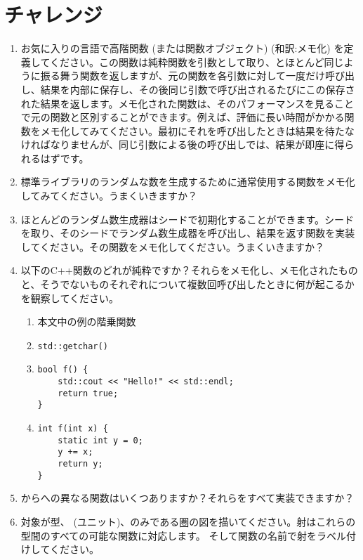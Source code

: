 \section{チャレンジ}

\begin{enumerate}
  \tightlist
  \item
        お気に入りの言語で高階関数 (または関数オブジェクト)  (和訳:メモ化) を定義してください。この関数は純粋関数を引数として取り、とほとんど同じように振る舞う関数を返しますが、元の関数を各引数に対して一度だけ呼び出し、結果を内部に保存し、その後同じ引数で呼び出されるたびにこの保存された結果を返します。メモ化された関数は、そのパフォーマンスを見ることで元の関数と区別することができます。例えば、評価に長い時間がかかる関数をメモ化してみてください。最初にそれを呼び出したときは結果を待たなければなりませんが、同じ引数による後の呼び出しでは、結果が即座に得られるはずです。
  \item
        標準ライブラリのランダムな数を生成するために通常使用する関数をメモ化してみてください。うまくいきますか？
  \item
        ほとんどのランダム数生成器はシードで初期化することができます。シードを取り、そのシードでランダム数生成器を呼び出し、結果を返す関数を実装してください。その関数をメモ化してください。うまくいきますか？
  \item
        以下のC++関数のどれが純粋ですか？それらをメモ化し、メモ化されたものと、そうでないものそれぞれについて複数回呼び出したときに何が起こるかを観察してください。

        \begin{enumerate}
          \tightlist
          \item
                本文中の例の階乗関数
          \item
                \begin{verbatim}
std::getchar()
\end{verbatim}
          \item
                \begin{verbatim}
bool f() {
    std::cout << "Hello!" << std::endl;
    return true;
}
\end{verbatim}
          \item
                \begin{verbatim}
int f(int x) {
    static int y = 0;
    y += x;
    return y;
}
\end{verbatim}
        \end{enumerate}
  \item
        からへの異なる関数はいくつありますか？それらをすべて実装できますか？
  \item
        対象が型、\code{()} (ユニット)、のみである圏の図を描いてください。射はこれらの型間のすべての可能な関数に対応します。
        そして関数の名前で射をラベル付けしてください。
\end{enumerate}
